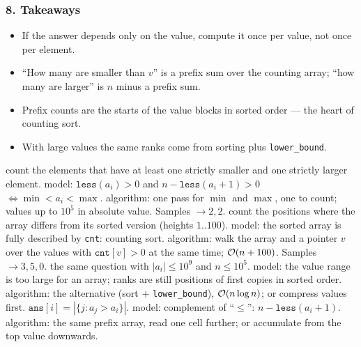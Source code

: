 \subsubsection*{8. Takeaways}

\begin{itemize}[leftmargin=*]
    \item If the answer depends only on the value, compute it once per value, not once per element.
    \item ``How many are smaller than $v$'' is a prefix sum over the counting array; ``how many are larger'' is $n$ minus a prefix sum.
    \item Prefix counts are the starts of the value blocks in sorted order --- the heart of counting sort.
    \item With large values the same ranks come from sorting plus \texttt{lower\_bound}.
\end{itemize}

\begin{variantsbox}
  {count the elements that have at least one strictly smaller and one strictly larger element.}
  {model: $\texttt{less}(a_i) > 0$ and $n - \texttt{less}(a_i + 1) > 0$ $\iff \min < a_i < \max$.}
  {algorithm: one pass for $\min$ and $\max$, one to count; values up to $10^5$ in absolute value. Samples $\to 2, 2$.}
  {count the positions where the array differs from its sorted version (heights $1..100$).}
  {model: the sorted array is fully described by \texttt{cnt}: counting sort.}
  {algorithm: walk the array and a pointer $v$ over the values with $\texttt{cnt}[v] > 0$ at the same time; $\mathcal{O}(n + 100)$. Samples $\to 3, 5, 0$.}
  {the same question with $|a_i| \le 10^9$ and $n \le 10^5$.}
  {model: the value range is too large for an array; ranks are still positions of first copies in sorted order.}
  {algorithm: the alternative (sort + \texttt{lower\_bound}), $\mathcal{O}(n \log n)$; or compress values first.}
  {$\texttt{ans}[i] = |\{ j : a_j > a_i \}|$.}
  {model: complement of ``$\le$'': $n - \texttt{less}(a_i + 1)$.}
  {algorithm: the same prefix array, read one cell further; or accumulate from the top value downwards.}
\end{variantsbox}
